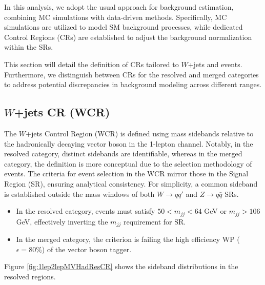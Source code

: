 \label{subsec:cr_selection}

In this analysis, we adopt the usual approach for background estimation, combining MC simulations with data-driven methods. Specifically, MC simulations are utilized to model SM background processes, while dedicated Control Regions (CRs) are established to adjust the background normalization within the SRs.

This section will detail the definition of CRs tailored to $W$+jets and \ttbar events. Furthermore, we distinguish between CRs for the resolved and merged categories to address potential discrepancies in background modeling across different \pt ranges.

\subsection{$W$+jets CR (WCR)}

The $W$+jets Control Region (WCR) is defined using mass sidebands relative to the hadronically decaying vector boson in the 1-lepton channel. Notably, in the resolved category, distinct sidebands are identifiable, whereas in the merged category, the definition is more conceptual due to the selection methodology of events. The criteria for event selection in the WCR mirror those in the Signal Region (SR), ensuring analytical consistency. For simplicity, a common sideband is established outside the mass windows of both $W\to qq'$ and $Z \to q\bar{q}$ SRs.
\begin{itemize}
    \item In the resolved category, events must satisfy $50 < m_{jj} < 64$ GeV or $m_{jj} > 106$ GeV, effectively inverting the $m_{jj}$ requirement for SR.
    \item In the merged category, the criterion is failing the high efficiency WP ($\epsilon=80\%$) of the vector boson tagger.
\end{itemize}

Figure \ref{fig:1lep2lepMVHadResCR} shows the sideband distributions in the resolved regions.

